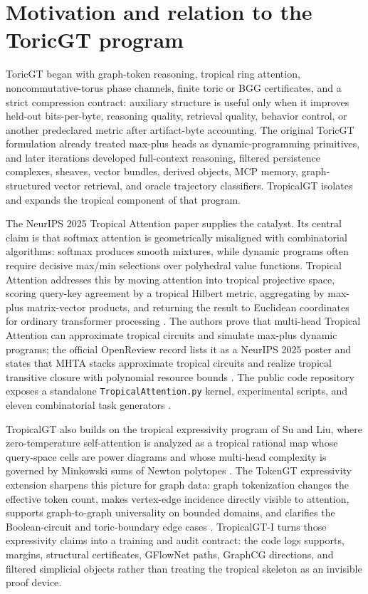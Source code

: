 \documentclass[11pt]{article}
\begin{document}
\tableofcontents
\newpage

\section{Motivation and relation to the ToricGT program}

ToricGT began with graph-token reasoning, tropical ring attention, noncommutative-torus phase channels, finite toric or BGG certificates, and a strict compression contract: auxiliary structure is useful only when it improves held-out bits-per-byte, reasoning quality, retrieval quality, behavior control, or another predeclared metric after artifact-byte accounting.  The original ToricGT formulation already treated max-plus heads as dynamic-programming primitives, and later iterations developed full-context reasoning, filtered persistence complexes, sheaves, vector bundles, derived objects, MCP memory, graph-structured vector retrieval, and oracle trajectory classifiers.  TropicalGT isolates and expands the tropical component of that program.

The NeurIPS 2025 Tropical Attention paper supplies the catalyst.  Its central claim is that softmax attention is geometrically misaligned with combinatorial algorithms: softmax produces smooth mixtures, while dynamic programs often require decisive max/min selections over polyhedral value functions.  Tropical Attention addresses this by moving attention into tropical projective space, scoring query-key agreement by a tropical Hilbert metric, aggregating by max-plus matrix-vector products, and returning the result to Euclidean coordinates for ordinary transformer processing \cite{hashemi2025tropical}.  The authors prove that multi-head Tropical Attention can approximate tropical circuits and simulate max-plus dynamic programs; the official OpenReview record lists it as a NeurIPS 2025 poster and states that MHTA stacks approximate tropical circuits and realize tropical transitive closure with polynomial resource bounds \cite{hashemi2025openreview}.  The public code repository exposes a standalone \texttt{TropicalAttention.py} kernel, experimental scripts, and eleven combinatorial task generators \cite{hashemi2025code}.

TropicalGT also builds on the tropical expressivity program of Su and Liu, where zero-temperature self-attention is analyzed as a tropical rational map whose query-space cells are power diagrams and whose multi-head complexity is governed by Minkowski sums of Newton polytopes \cite{su2026expressivity}.  The TokenGT expressivity extension sharpens this picture for graph data: graph tokenization changes the effective token count, makes vertex-edge incidence directly visible to attention, supports graph-to-graph universality on bounded domains, and clarifies the Boolean-circuit and toric-boundary edge cases \cite{schreiber2026tokengtexpressivity}.  TropicalGT-I turns those expressivity claims into a training and audit contract: the code logs supports, margins, structural certificates, GFlowNet paths, GraphCG directions, and filtered simplicial objects rather than treating the tropical skeleton as an invisible proof device.
\end{document}
